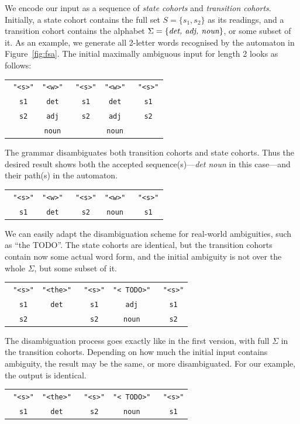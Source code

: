 \documentclass[11pt]{article}
\def\t#1{\texttt{#1}}
\def\h#1{{\tt \color{gray} #1}}
\def\swf{\h{"<s>"}}
\def\exampleWord{{\color{red} TODO}}
\begin{document}
We encode our input as a sequence of \emph{state cohorts} and \emph{transition cohorts}.
Initially, a state cohort contains the full set $S = \{s_1, s_2\}$ as
its readings, and a
transition cohort contains the alphabet $\Sigma = \{\emph{det, adj, noun}\}$, or some
subset of it.
As an example, we generate all 2-letter words recognised by the
automaton in Figure~\ref{fig:fsa}. The initial maximally ambiguous
input for length 2 looks as follows:
%
\begin{center}
  \renewcommand{\tabcolsep}{2.5pt}
  \begin{tabular}{ccccc}
    \swf   & \t{"<w>"}  & \swf   & \t{"<w>"} & \swf   \\ 
    \h{s1} & \t{det}      & \h{s1} & \t{det} & \h{s1} \\
    \h{s2} & \t{adj}      & \h{s2} & \t{adj} & \h{s2} \\
           & \t{noun}     &        & \t{noun} &               
  \end{tabular}
\end{center}
%
\noindent 
The grammar disambiguates both transition cohorts and state cohorts. Thus
the desired result shows both the accepted sequence(s)---\emph{det noun}
in this case---and their path(s) in the automaton.
%
\begin{center}
  \renewcommand{\tabcolsep}{2.5pt}
  \begin{tabular}{ccccc}
    \swf   & \t{"<w>"}  & \swf   & \t{"<w>"} & \swf   \\ 
    \h{s1} & \t{det}    & \h{s2} & \t{noun}  & \h{s1}       
  \end{tabular}
\end{center}
%
We can easily adapt the disambiguation scheme for real-world
ambiguities, such as ``the \exampleWord{}''. The state cohorts are identical, but the transition
cohorts contain now some actual word form, and the initial ambiguity
is not over the whole $\Sigma$, but some subset of it.
%
\begin{center}
  \renewcommand{\tabcolsep}{2.5pt}
  \begin{tabular}{ccccc}
    \swf   & \t{"<the>"}  & \swf   & \t{"<\exampleWord{}>"} & \swf    \\ 
    \h{s1} & \t{det}      & \h{s1} & \t{adj}   & \h{s1}  \\
    \h{s2} &              & \h{s2} & \t{noun}  & \h{s2}     
  \end{tabular}
\end{center}
%
The disambiguation process goes exactly like in the first version, with full
$\Sigma$ in the transition cohorts.
Depending on how much the initial input contains ambiguity, the
result may be the same, or more disambiguated. For our example, the
output is identical.
\begin{center}
  \renewcommand{\tabcolsep}{2.5pt}
  \begin{tabular}{ccccc}
    \swf   & \t{"<the>"}  & \swf   & \t{"<\exampleWord{}>"} & \swf    \\ 
    \h{s1} & \t{det}      & \h{s2} & \t{noun} & \h{s1}  \\
  \end{tabular}
\end{center}
%
%
\end{document}
